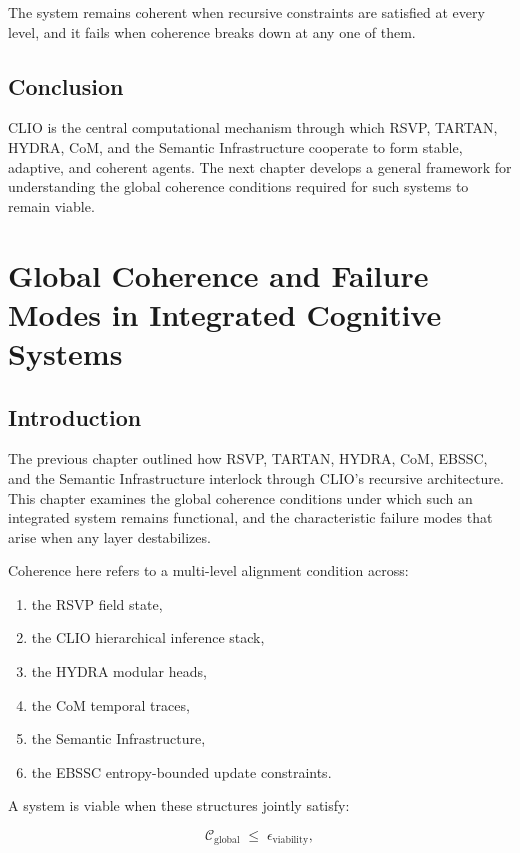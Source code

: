 \documentclass[12pt,oneside]{book}
\theoremstyle{plain}
\theoremstyle{definition}
\begin{document}
The system remains coherent when recursive constraints are satisfied at every
level, and it fails when coherence breaks down at any one of them.

\section{Conclusion}

CLIO is the central computational mechanism through which RSVP, TARTAN,
HYDRA, CoM, and the Semantic Infrastructure cooperate to form stable,
adaptive, and coherent agents.
The next chapter develops a general framework for understanding the global
coherence conditions required for such systems to remain viable.

\chapter{Global Coherence and Failure Modes in Integrated Cognitive Systems}

\section{Introduction}

The previous chapter outlined how RSVP, TARTAN, HYDRA, CoM, EBSSC, and the
Semantic Infrastructure interlock through CLIO’s recursive architecture.
This chapter examines the global coherence conditions under which such an
integrated system remains functional, and the characteristic failure modes
that arise when any layer destabilizes.

Coherence here refers to a multi-level alignment condition across:

\begin{enumerate}
    \item the RSVP field state,
    \item the CLIO hierarchical inference stack,
    \item the HYDRA modular heads,
    \item the CoM temporal traces,
    \item the Semantic Infrastructure,
    \item the EBSSC entropy-bounded update constraints.
\end{enumerate}

A system is viable when these structures jointly satisfy:

\[
\mathcal{C}_{\mathrm{global}} \;\le\; \epsilon_{\mathrm{viability}},
\]
\end{document}
